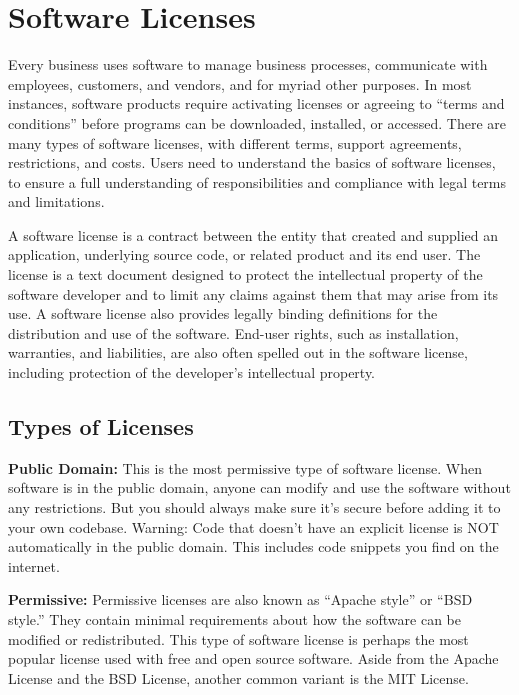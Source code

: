 \section{Software Licenses}\label{licenses}

\begin{flushleft}
	Every business uses software to manage business processes, communicate with
	employees, customers, and vendors, and for myriad other purposes. In most instances,
	software products require activating licenses or agreeing to ``terms and conditions''
	before programs can be downloaded, installed, or accessed. There are many types
	of software licenses, with different terms, support agreements, restrictions, and
	costs. Users need to understand the basics of software licenses, to ensure a
	full understanding of responsibilities and compliance with legal terms and
	limitations.
\end{flushleft}

\begin{flushleft}
	A software license is a contract between the entity that created and supplied
	an application, underlying source code, or related product and its end user.
	The license is a text document designed to protect the intellectual property
	of the software developer and to limit any claims against them that may arise
	from its use. A software license also provides legally binding definitions for
	the distribution and use of the software. End-user rights, such as installation,
	warranties, and liabilities, are also often spelled out in the software license,
	including protection of the developer's intellectual property.
\end{flushleft}

\subsection{Types of Licenses}\label{license-types}

\begin{flushleft}
	\textbf{Public Domain:} This is the most permissive type of software license.
	When software is in the public domain, anyone can modify and use the software
	without any restrictions. But you should always make sure it's secure before
	adding it to your own codebase. Warning: Code that doesn't have an explicit
	license is NOT automatically in the public domain. This includes code snippets
	you find on the internet.
\end{flushleft}

\begin{flushleft}
	\textbf{Permissive:} Permissive licenses are also known as ``Apache style'' or
	``BSD style.'' They contain minimal requirements about how the software can be
	modified or redistributed. This type of software license is perhaps the most
	popular license used with free and open source software. Aside from the Apache
	License and the BSD License, another common variant is the MIT License.
\end{flushleft}

